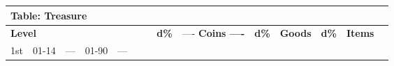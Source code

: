 \vspace{12pt}
\begin{longtable}{llllllllllllll}
\hline
\multicolumn{7}{|p{4.097in}|}{\begin{minipage}[t]{4.097in}\raggedright
\textbf{Table: Treasure}\end{minipage}}\\
\hline
\multicolumn{7}{p{0.403in}|}{\begin{minipage}[t]{0.403in}\centering
\textbf{Level}\end{minipage}} & \multicolumn{1}{|p{0.393in}|}{\begin{minipage}[t]{0.393in}\centering
\textbf{d\%}\end{minipage}} & \multicolumn{1}{p{0.469in}|}{\begin{minipage}[t]{0.469in}\raggedright
----\textbf{ Coins ----}\end{minipage}} & \multicolumn{1}{p{0.923in}|}{\begin{minipage}[t]{0.923in}\raggedright
\textbf{d\%}\end{minipage}} & \multicolumn{1}{p{0.469in}|}{\begin{minipage}[t]{0.469in}\raggedright
\textbf{Goods}\end{minipage}} & \multicolumn{1}{p{0.626in}|}{\begin{minipage}[t]{0.626in}\raggedright
\textbf{d\%}\end{minipage}} & \multicolumn{1}{p{0.469in}|}{\begin{minipage}[t]{0.469in}\centering
\textbf{Items}\end{minipage}}\\
\hline
\multicolumn{1}{p{0.748in}|}{\begin{minipage}[t]{0.748in}\centering
1st\end{minipage}} & \multicolumn{1}{p{0.058in}|}{\begin{minipage}[t]{0.058in}\raggedright
01-14\end{minipage}} & \multicolumn{1}{p{0.058in}|}{\begin{minipage}[t]{0.058in}\raggedright
---\end{minipage}} & \multicolumn{1}{p{0.058in}|}{\begin{minipage}[t]{0.058in}\raggedright
01-90\end{minipage}} & \multicolumn{1}{p{0.058in}|}{\begin{minipage}[t]{0.058in}\raggedright
---\end{minipage}} & \multicolumn{1}{p{0.058in}|}{\begin{minipage}[t]{0.058in}\raggedright

\end{minipage}}
\end{longtable}

